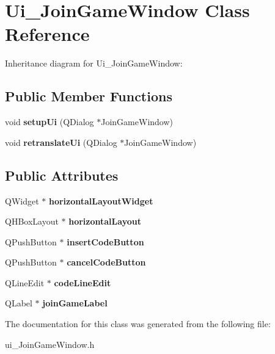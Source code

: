 \hypertarget{classUi__JoinGameWindow}{}\section{Ui\+\_\+\+Join\+Game\+Window Class Reference}
\label{classUi__JoinGameWindow}


Inheritance diagram for Ui\+\_\+\+Join\+Game\+Window\+:
\subsection*{Public Member Functions}
\begin{DoxyCompactItemize}
\item 
\mbox{\label{classUi__JoinGameWindow_ab613f8ea125eba63a5e77f739a40d511}} 
void {\bfseries setup\+Ui} (Q\+Dialog $\ast$Join\+Game\+Window)
\item 
\mbox{\label{classUi__JoinGameWindow_af953b81fdf0f3c492194a555f6a7a228}} 
void {\bfseries retranslate\+Ui} (Q\+Dialog $\ast$Join\+Game\+Window)
\end{DoxyCompactItemize}
\subsection*{Public Attributes}
\begin{DoxyCompactItemize}
\item 
\mbox{\label{classUi__JoinGameWindow_ac109bc6ccb6c959e5801cb889a04ec9a}} 
Q\+Widget $\ast$ {\bfseries horizontal\+Layout\+Widget}
\item 
\mbox{\label{classUi__JoinGameWindow_afefb08bd3f9925734999ac0d58198aee}} 
Q\+H\+Box\+Layout $\ast$ {\bfseries horizontal\+Layout}
\item 
\mbox{\label{classUi__JoinGameWindow_a160555fad5f69c945e1817aabf94a319}} 
Q\+Push\+Button $\ast$ {\bfseries insert\+Code\+Button}
\item 
\mbox{\label{classUi__JoinGameWindow_a88de01eb14bcbb878f8f0c2b1c3ad782}} 
Q\+Push\+Button $\ast$ {\bfseries cancel\+Code\+Button}
\item 
\mbox{\label{classUi__JoinGameWindow_a3680e7b8a4c41de4a236123e363b1d70}} 
Q\+Line\+Edit $\ast$ {\bfseries code\+Line\+Edit}
\item 
\mbox{\label{classUi__JoinGameWindow_a26a78a780af227c94e728694e8db5748}} 
Q\+Label $\ast$ {\bfseries join\+Game\+Label}
\end{DoxyCompactItemize}


The documentation for this class was generated from the following file\+:\begin{DoxyCompactItemize}
\item 
ui\+\_\+\+Join\+Game\+Window.\+h\end{DoxyCompactItemize}

